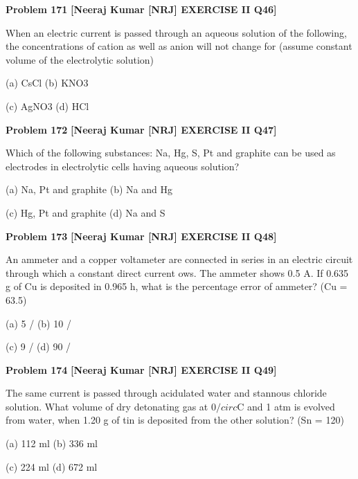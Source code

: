 \begin{problembox}
\textbf{Problem 171} \hfill \textbf{[Neeraj Kumar [NRJ] EXERCISE II Q46]}
\label{q:ext-nrj_all_questions-171}

When an electric current is passed through 
an aqueous solution of the following, the 
concentrations of cation as well as anion will 
not change for (assume constant volume of the 
electrolytic solution)
 
 (a) CsCl 
(b) KNO3
 
 (c) AgNO3 
(d) HCl
\end{problembox}

\begin{problembox}
\textbf{Problem 172} \hfill \textbf{[Neeraj Kumar [NRJ] EXERCISE II Q47]}
\label{q:ext-nrj_all_questions-172}

Which of the following substances: Na, Hg, 
S, Pt and graphite can be used as electrodes in 
electrolytic cells having aqueous solution?
 
 (a) Na, Pt and graphite 
(b) Na and Hg
 
 (c) Hg, Pt and graphite 
(d) Na and S
\end{problembox}

\begin{problembox}
\textbf{Problem 173} \hfill \textbf{[Neeraj Kumar [NRJ] EXERCISE II Q48]}
\label{q:ext-nrj_all_questions-173}

An ammeter and a copper voltameter are connected 
in series in an electric  circuit through which a 
constant direct  current   ows. The ammeter shows 
0.5 A. If 0.635 g of Cu is deposited in 0.965 h, what 
is the percentage error of ammeter? (Cu = 63.5)
 
 (a) 5 /%
(b) 10 /%
 
 (c) 9 /%
(d) 90 /%
\end{problembox}

\begin{problembox}
\textbf{Problem 174} \hfill \textbf{[Neeraj Kumar [NRJ] EXERCISE II Q49]}
\label{q:ext-nrj_all_questions-174}

The same current is passed through acidulated 
water and stannous chloride  solution. What 
volume of dry detonating gas at 0$/circ$C and 1 atm is 
evolved from water, when 1.20 g of tin is deposited 
from the other solution? (Sn = 120)
 
 (a) 112 ml 
(b) 336 ml
 
 (c) 224 ml 
(d) 672 ml
\end{problembox}

